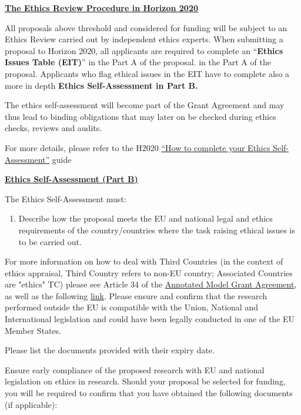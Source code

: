 \bigskip\noindent
{\large {\bf \ul{The Ethics Review Procedure in Horizon 2020}}}

\medskip\noindent
All proposals above threshold and considered for funding will be subject to an Ethics Review carried out by independent ethics experts. When submitting a proposal to Horizon 2020, all applicants are required to complete an ``{\bf Ethics Issues Table (EIT)}'' in the Part A of the proposal. 
in the Part A of the proposal. Applicants who flag ethical issues in the EIT have to complete also a more in depth {\bf Ethics Self-Assessment in Part B.}

\medskip\noindent
The ethics self-assessment will become part of the Grant Agreement and may thus lead to binding obligations that may later on be checked during ethics checks, reviews and audits.

\medskip\noindent
For more details, please refer to the H2020 \href{http://ec.europa.eu/research/participants/data/ref/h2020/grants_manual/hi/ethics/h2020_hi_ethics-self-assess_en.pdf}{“How to complete your Ethics Self-Assessment”} guide


\bigskip\noindent
{\large {\bf \ul{Ethics Self-Assessment (Part B)}}}

\medskip\noindent
The Ethics Self-Assessment must:

{\bf
	\begin{enumerate}
		\item Describe how the proposal meets the EU and national legal and ethics requirements of the country/countries where the task raising ethical issues is to be carried out. 
	\end{enumerate}
}

\medskip\noindent
For more information on how to deal with Third Countries (in the context of ethics appraisal, Third Country refers to non-EU country; Associated Countries are "ethics" TC) please see Article 34 of the \href{http://ec.europa.eu/research/participants/data/ref/h2020/grants_manual/amga/h2020-amga_en.pdf}{Annotated Model Grant Agreement}, as well as the following \href{http://ec.europa.eu/justice/data-protection/international-transfers/adequacy/index_en.htm}{link}. Please ensure and confirm that the research performed outside the EU is compatible with the Union, National and International legislation and could have been legally conducted in one of the EU Member States.

\medskip\noindent
Please list the documents provided with their expiry date.

\medskip\noindent
Ensure early compliance of the proposed research with EU and national legislation on ethics in research. Should your proposal be selected for funding, you will be required to confirm that you have obtained the following documents (if applicable):

